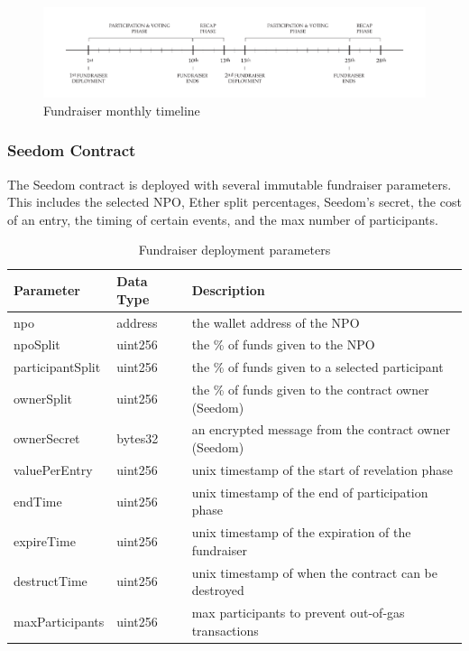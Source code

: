 \documentclass[11pt]{article}
\begin{document}
\begin{figure}[H]
\begin{center}
\includegraphics[width=1.0\textwidth]{./graphics/fundraiser-monthly-timeline.pdf}
\caption{Fundraiser monthly timeline}
\label{figure:fundraiserMonthlyTimeline}
\end{center}
\end{figure}

\subsubsection{Seedom Contract}

The Seedom contract is deployed with several immutable fundraiser parameters. This includes the selected NPO, Ether split percentages, Seedom's secret, the cost of an entry, the timing of certain events, and the max number of participants.

\begin{table}[H]
\begin{center}
\begin{tabular}{| l | l | l |}
\hline
\textbf{Parameter} & \textbf{Data Type} & \textbf{Description} \\ \hline
npo & address & the wallet address of the NPO \\ \hline
npoSplit & uint256 & the \% of funds given to the NPO \\ \hline
participantSplit & uint256 & the \% of funds given to a selected participant \\ \hline
ownerSplit & uint256 & the \% of funds given to the contract owner (Seedom) \\ \hline
ownerSecret & bytes32 & an encrypted message from the contract owner (Seedom) \\ \hline
valuePerEntry & uint256 & unix timestamp of the start of revelation phase \\ \hline
endTime & uint256 & unix timestamp of the end of participation phase \\ \hline
expireTime & uint256 & unix timestamp of the expiration of the fundraiser \\ \hline
destructTime & uint256 & unix timestamp of when the contract can be destroyed \\ \hline
maxParticipants & uint256 & max participants to prevent out-of-gas transactions \\ \hline
\end{tabular}
\caption{Fundraiser deployment parameters}
\label{tab:fundraiserDeploymentParameters}
\end{center}
\end{table}
\end{document}
